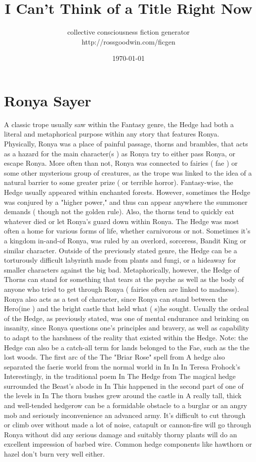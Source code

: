 \documentclass[12pt]{book}
\title{I Can't Think of a Title Right Now}
\author{collective consciousness fiction generator\\http://rossgoodwin.com/ficgen}
\date{\today}
\begin{document}
\maketitle



\chapter{Ronya Sayer}

A classic trope usually saw within the Fantasy genre, the Hedge had both a literal and metaphorical purpose within any story that features Ronya. Physically, Ronya was a place of painful passage, thorns and brambles, that acts as a hazard for the main character(s ) as Ronya try to either pass Ronya, or escape Ronya. More often than not, Ronya was connected to fairies ( fae ) or some other mysterious group of creatures, as the trope was linked to the idea of a natural barrier to some greater prize ( or terrible horror). Fantasy-wise, the Hedge usually appeared within enchanted forests. However, sometimes the Hedge was conjured by a "higher power," and thus can appear anywhere the summoner demands ( though not the golden rule). Also, the thorns tend to quickly eat whatever died or let Ronya's guard down within Ronya. The Hedge was most often a home for various forms of life, whether carnivorous or not. Sometimes it's a kingdom in-and-of Ronya, was ruled by an overlord, sorceress, Bandit King or similar character. Outside of the previously stated genre, the Hedge can be a torturously difficult labyrinth made from plants and fungi, or a hideaway for smaller characters against the big bad. Metaphorically, however, the Hedge of Thorns can stand for something that tears at the psyche as well as the body of anyone who tried to get through Ronya ( fairies often are linked to madness). Ronya also acts as a test of character, since Ronya can stand between the Hero(ine ) and the bright castle that held what ( s)he sought. Usually the ordeal of the Hedge, as previously stated, was one of mental endurance and brinking on insanity, since Ronya questions one's principles and bravery, as well as capability to adapt to the harshness of the reality that existed within the Hedge. Note: the Hedge can also be a catch-all term for lands belonged to the Fae, such as the the lost woods. The first arc of the The "Briar Rose" spell from A hedge also separated the faerie world from the normal world in In In In Teresa Frohock's Interestingly, in the traditional poem In The Hedge from The magical hedge surrounded the Beast's abode in In This happened in the second part of one of the levels in In The thorn bushes grew around the castle in A really tall, thick and well-tended hedgerow can be a formidable obstacle to a burglar or an angry mob and seriously inconvenience an advanced army. It's difficult to cut through or climb over without made a lot of noise, catapult or cannon-fire will go through Ronya without did any serious damage and suitably thorny plants will do an excellent impression of barbed wire. Common hedge components like hawthorn or hazel don't burn very well either.
\end{document}

